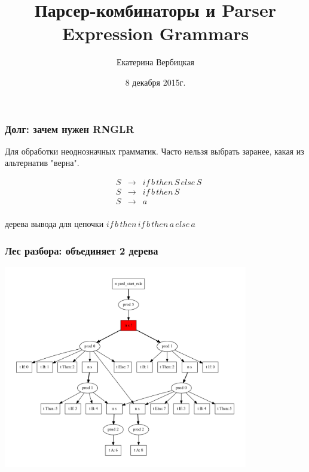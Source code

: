 \documentclass{beamer}
\title[]{Парсер-комбинаторы и Parser Expression Grammars}
\subtitle[]{}
\institute[]{
Санкт-Петербургский государственный университет \\
Математико-механический факультет }
\author[Екатерина Вербицкая]{Екатерина Вербицкая}
\date{8 декабря 2015г.}
\begin{document}
{
\begin{frame}[fragile]
  \titlepage
\end{frame}
}

\begin{frame}[fragile]
  \transwipe[direction=90]
  \frametitle{Долг: зачем нужен RNGLR}
\pause 
Для обработки неоднозначных грамматик. Часто нельзя выбрать заранее, какая из альтернатив "верна".

\pause

$$
\begin{array}{crcl}
&S & \rightarrow & if \, b \, then \, S \, else \, S \\ 
&S & \rightarrow & if \, b \, then \, S \\ 
&S & \rightarrow & a \\ 
\end{array}
$$   	            

 дерева вывода для цепочки $if \, b \, then \, if \, b \, then \, a \, else \, a$             


\end{frame}


\begin{frame}[fragile]
  \transwipe[direction=90]
  \frametitle{Лес разбора: объединяет 2 дерева}
\begin{center}
  \includegraphics[width=0.8\textwidth]{pics/sppf} 
\end{center}
\end{frame}
\end{document}
